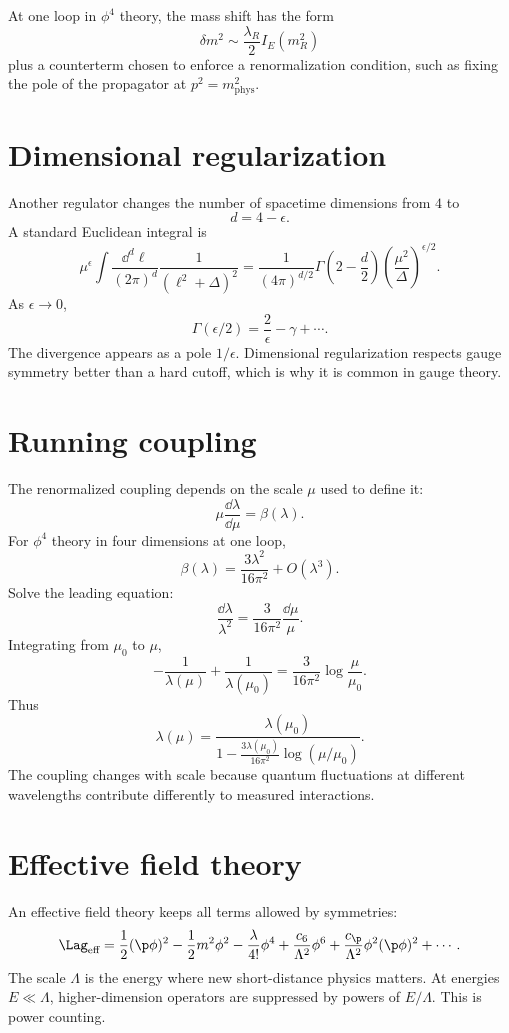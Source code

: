 At one loop in \(\phi^4\) theory, the mass shift has the form
\[
  \delta m^2\sim \frac{\lambda_R}{2}I_E(m_R^2)
\]
plus a counterterm chosen to enforce a renormalization condition, such as fixing the pole of the propagator at \(p^2=m_{\text{phys}}^2\).

\section{Dimensional regularization}

Another regulator changes the number of spacetime dimensions from \(4\) to
\[
  d=4-\epsilon.
\]
A standard Euclidean integral is
\[
  \mu^\epsilon
  \int\frac{\dd^d\ell}{(2\pi)^d}
  \frac{1}{(\ell^2+\Delta)^2}
  =
  \frac{1}{(4\pi)^{d/2}}
  \Gamma\left(2-\frac d2\right)
  \left(\frac{\mu^2}{\Delta}\right)^{\epsilon/2}.
\]
As \(\epsilon\to0\),
\[
  \Gamma(\epsilon/2)=\frac{2}{\epsilon}-\gamma+\cdots.
\]
The divergence appears as a pole \(1/\epsilon\).  Dimensional regularization respects gauge symmetry better than a hard cutoff, which is why it is common in gauge theory.

\section{Running coupling}

The renormalized coupling depends on the scale \(\mu\) used to define it:
\[
  \mu\frac{\dd\lambda}{\dd\mu}=\beta(\lambda).
\]
For \(\phi^4\) theory in four dimensions at one loop,
\[
  \beta(\lambda)=\frac{3\lambda^2}{16\pi^2}+O(\lambda^3).
\]
Solve the leading equation:
\[
  \frac{\dd\lambda}{\lambda^2}
  =
  \frac{3}{16\pi^2}\frac{\dd\mu}{\mu}.
\]
Integrating from \(\mu_0\) to \(\mu\),
\[
  -\frac1{\lambda(\mu)}+\frac1{\lambda(\mu_0)}
  =
  \frac{3}{16\pi^2}\log\frac{\mu}{\mu_0}.
\]
Thus
\[
  \lambda(\mu)=
  \frac{\lambda(\mu_0)}
  {1-\frac{3\lambda(\mu_0)}{16\pi^2}\log(\mu/\mu_0)}.
\]
The coupling changes with scale because quantum fluctuations at different wavelengths contribute differently to measured interactions.

\section{Effective field theory}

An effective field theory keeps all terms allowed by symmetries:
\[
  \Lag_{\text{eff}}
  =
  \frac12(\p\phi)^2-\frac12m^2\phi^2
  -\frac{\lambda}{4!}\phi^4
  +\frac{c_6}{\Lambda^2}\phi^6
  +\frac{c_{\p}}{\Lambda^2}\phi^2(\p\phi)^2+\cdots.
\]
The scale \(\Lambda\) is the energy where new short-distance physics matters.  At energies \(E\ll\Lambda\), higher-dimension operators are suppressed by powers of \(E/\Lambda\).  This is power counting.


